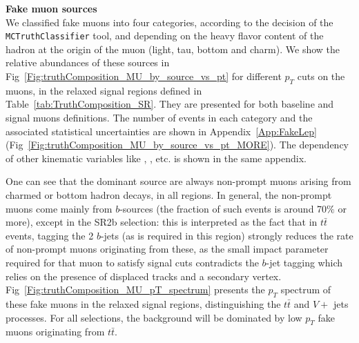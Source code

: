 \par{\bf Fake muon sources\\}
We classified fake muons into four categories, according to the decision of the \texttt{MCTruthClassifier} tool, and depending on the heavy flavor content of the hadron at the origin of the muon (light, tau, bottom and charm). We show the relative abundances of these sources in Fig~\ref{Fig:truthComposition_MU_by_source_vs_pt} for different $p_T$ cuts on the muons, in the relaxed signal regions defined in Table~\ref{tab:TruthComposition_SR}. They are presented for both baseline and signal muons definitions. The number of events in each category and the associated statistical uncertainties are shown in Appendix~\ref{App:FakeLep} (Fig~\ref{Fig:truthComposition_MU_by_source_vs_pt_MORE}). The dependency of other kinematic variables like \met, \meff, etc. is shown in the same appendix.

One can see that the dominant source are always non-prompt muons arising from charmed or bottom hadron decays, in all \pt regions. In general, the non-prompt muons come mainly from $b$-sources (the fraction of such events is around 70$\%$ or more), 
except in the SR2b selection: this is interpreted as the fact that in $t\bar t$ events, tagging the 2 $b$-jets (as is required in this region) strongly reduces the rate of non-prompt muons originating from these, as the small impact parameter required for that muon to satisfy signal cuts contradicts the $b$-jet tagging which relies on the presence of displaced tracks and a secondary vertex. Fig~\ref{Fig:truthComposition_MU_pT_spectrum} presents the $p_T$ spectrum of these fake muons in the relaxed signal regions, distinguishing the $t\bar t$ and $V+$ jets processes. For all selections, the background will be dominated by low $p_T$ fake muons originating from $t\bar t$. 

